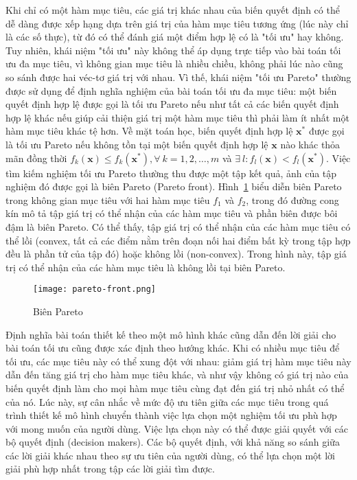 \documentclass[../main.tex]{subfiles}
\begin{document}
Khi chỉ có một hàm mục tiêu, các giá trị khác nhau của biến quyết định có thể dễ dàng được xếp hạng dựa trên giá trị của hàm mục tiêu tương ứng (lúc này chỉ là các số thực), từ đó có thể đánh giá một điểm hợp lệ có là "tối ưu" hay không. Tuy nhiên, khái niệm "tối ưu" này không thể áp dụng trực tiếp vào bài toán tối ưu đa mục tiêu, vì không gian mục tiêu là nhiều chiều, không phải lúc nào cũng so sánh được hai véc-tơ giá trị với nhau. Vì thế, khái niệm "tối ưu Pareto" thường được sử dụng để định nghĩa nghiệm của bài toán tối ưu đa mục tiêu: một biến quyết định hợp lệ được gọi là tối ưu Pareto nếu như tất cả các biến quyết định hợp lệ khác nếu giúp cải thiện giá trị một hàm mục tiêu thì phải làm ít nhất một hàm mục tiêu khác tệ hơn. Về mặt toán học, biến quyết định hợp lệ $\mathbf{x^*}$ được gọi là tối ưu Pareto nếu không tồn tại một biến quyết định hợp lệ $\mathbf{x}$ nào khác thỏa mãn đồng thời $f_k\left(\mathbf{x}\right) \leq f_k\left(\mathbf{x^*}\right), \forall\ k=1,2,\ldots,m$ và $\exists\ l: f_l\left(\mathbf{x}\right) < f_l\left(\mathbf{x^*}\right)$. Việc tìm kiếm nghiệm tối ưu Pareto thường thu được một tập kết quả, ảnh của tập nghiệm đó được gọi là biên Pareto (Pareto front).  Hình~\ref{fig:Pareto} biểu diễn biên Pareto trong không gian mục tiêu với hai hàm mục tiêu $f_1$ và $f_2$, trong đó đường cong kín mô tả tập giá trị có thể nhận của các hàm mục tiêu và phần biên được bôi đậm là biên Pareto. Có thể thấy, tập giá trị có thể nhận của các hàm mục tiêu có thể lồi (convex, tất cả các điểm nằm trên đoạn nối hai điểm bất kỳ trong tập hợp đều là phần tử của tập đó) hoặc không lồi (non-convex). Trong hình này, tập giá trị có thể nhận của các hàm mục tiêu là không lồi tại biên Pareto.

\begin{figure}
\centering
\texttt{[image: pareto-front.png]}
\caption{Biên Pareto}
\label{fig:Pareto}
\end{figure}

Định nghĩa bài toán thiết kế theo một mô hình khác cũng dẫn đến lời giải cho bài toán tối ưu cũng được xác định theo hướng khác. Khi có nhiều mục tiêu để tối ưu, các mục tiêu này có thể xung đột với nhau: giảm giá trị hàm mục tiêu này dẫn đến tăng giá trị cho hàm mục tiêu khác, và như vậy không có giá trị nào của biến quyết định làm cho mọi hàm mục tiêu cùng đạt đến giá trị nhỏ nhất có thể của nó. Lúc này, sự cân nhắc về mức độ ưu tiên giữa các mục tiêu trong quá trình thiết kế mô hình chuyển thành việc lựa chọn một nghiệm tối ưu phù hợp với mong muốn của người dùng. Việc lựa chọn này có thể được giải quyết với các bộ quyết định (decision makers). Các bộ quyết định, với khả năng so sánh giữa các lời giải khác nhau theo sự ưu tiên của người dùng, có thể lựa chọn một lời giải phù hợp nhất trong tập các lời giải tìm được. 
\end{document}
